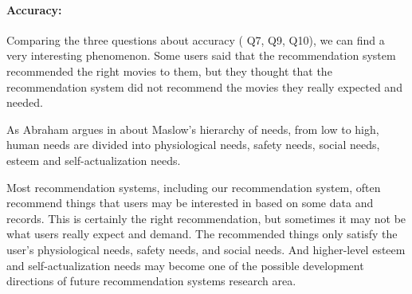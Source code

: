 \paragraph{Accuracy: }
Comparing the three questions about accuracy ( Q7, Q9, Q10), we can find a very interesting phenomenon. Some users said that the recommendation system recommended the right movies to them, but they thought that the recommendation system did not recommend the movies they really expected and needed.
\par As Abraham argues in \cite{maslow1943theory} about Maslow's hierarchy of needs, from low to high, human needs are divided into physiological needs, safety needs, social needs, esteem and self-actualization needs.
\par Most recommendation systems, including our recommendation system, often recommend things that users may be interested in based on some data and records. This is certainly the right recommendation, but sometimes it may not be what users really expect and demand. The recommended things only satisfy the user's physiological needs, safety needs, and social needs. And higher-level esteem and self-actualization needs may become one of the possible development directions of future recommendation systems research area.
	

\cleardoublepage